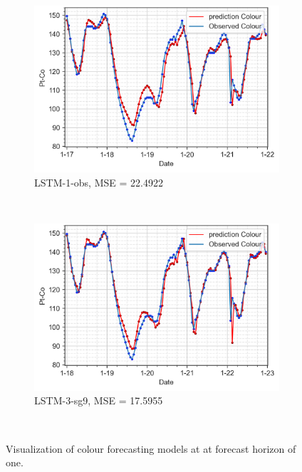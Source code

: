 \begin{figure}[!ht]
  \centering
  \begin{subfigure}[t]{0.7\textwidth}
    \includegraphics[width=\linewidth]{imgs/results/steps/colour-lstm-1-fc1.png}
    \caption{LSTM-1-obs, MSE = 22.4922} \label{fig:colour-lstm-1-fc1}
  \end{subfigure}\\
  \vspace{1em}
  \begin{subfigure}[t]{0.7\textwidth}
    \includegraphics[width=\linewidth]{imgs/results/steps/colour-lstm-3-fc1.png}
    \caption{LSTM-3-sg9, MSE = 17.5955} \label{fig:colour-lstm-3-fc1}
  \end{subfigure}\\
\caption{Visualization of colour forecasting models at at forecast horizon of one.} \label{fig:colour-forecast-fc1}
\end{figure}

